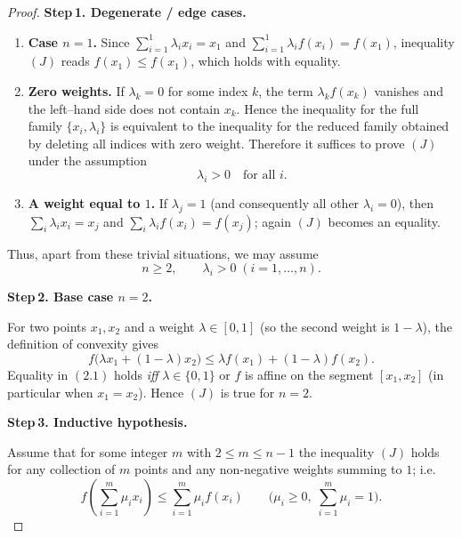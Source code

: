 \begin{proof}
\textbf{Step 1. Degenerate / edge cases.}  

\begin{enumerate}
\item \textbf{Case \(n=1\).}  
Since \(\displaystyle\sum_{i=1}^{1}\lambda_{i}x_{i}=x_{1}\) and
\(\displaystyle\sum_{i=1}^{1}\lambda_{i}f(x_{i})=f(x_{1})\), inequality \((J)\) reads
\(f(x_{1})\le f(x_{1})\), which holds with equality.

\item \textbf{Zero weights.}  
If \(\lambda_{k}=0\) for some index \(k\), the term \(\lambda_{k}f(x_{k})\) vanishes
and the left–hand side does not contain \(x_{k}\). Hence the inequality for the
full family \(\{x_{i},\lambda_{i}\}\) is equivalent to the inequality for the
reduced family obtained by deleting all indices with zero weight. Therefore it
suffices to prove \((J)\) under the assumption
\[
\lambda_{i}>0 \quad\text{for all }i.
\]

\item \textbf{A weight equal to \(1\).}  
If \(\lambda_{j}=1\) (and consequently all other \(\lambda_{i}=0\)), then
\(\sum_{i}\lambda_{i}x_{i}=x_{j}\) and \(\sum_{i}\lambda_{i}f(x_{i})=f(x_{j})\);
again \((J)\) becomes an equality.
\end{enumerate}
Thus, apart from these trivial situations, we may assume
\[
n\ge 2,\qquad \lambda_{i}>0\;(i=1,\dots ,n). \tag{1}
\]

\bigskip

\textbf{Step 2. Base case \(n=2\).}  

For two points \(x_{1},x_{2}\) and a weight \(\lambda\in[0,1]\) (so the second
weight is \(1-\lambda\)), the definition of convexity gives
\begin{equation*}
f\bigl(\lambda x_{1}+(1-\lambda)x_{2}\bigr)\le
\lambda f(x_{1})+(1-\lambda)f(x_{2}). \tag{2.1}
\end{equation*}
Equality in \((2.1)\) holds \emph{iff} \(\lambda\in\{0,1\}\) or \(f\) is affine on
the segment \([x_{1},x_{2}]\) (in particular when \(x_{1}=x_{2}\)). Hence \((J)\)
is true for \(n=2\).

\bigskip

\textbf{Step 3. Inductive hypothesis.}  

Assume that for some integer \(m\) with \(2\le m\le n-1\) the inequality
\((J)\) holds for any collection of \(m\) points and any non‑negative weights
summing to \(1\); i.e.
\begin{equation*}
f\!\left(\sum_{i=1}^{m}\mu_{i}x_{i}\right)\le
\sum_{i=1}^{m}\mu_{i}f(x_{i})\qquad
\bigl(\mu_{i}\ge0,\;\sum_{i=1}^{m}\mu_{i}=1\bigr). \tag{3.1}
\end{equation*}


\end{proof}
